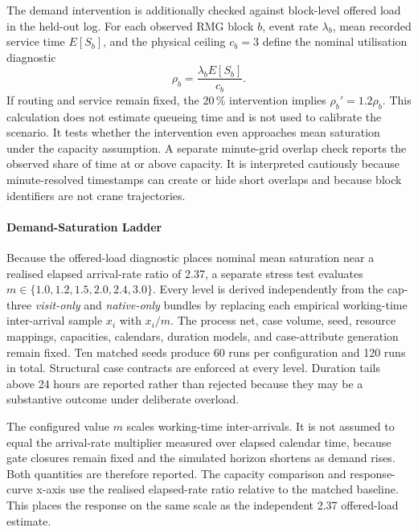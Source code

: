 The demand intervention is additionally checked against block-level offered
load in the held-out log. For each observed RMG block $b$, event rate
$\lambda_b$, mean recorded service time $E[S_b]$, and the physical ceiling
$c_b=3$ define the nominal utilisation diagnostic
\begin{equation}
    \rho_b=\frac{\lambda_b E[S_b]}{c_b}.
\end{equation}
If routing and service remain fixed, the 20\,\% intervention implies
$\rho_b'=1.2\rho_b$. This calculation does not estimate queueing time and is
not used to calibrate the scenario. It tests whether the intervention even
approaches mean saturation under the capacity assumption. A separate
minute-grid overlap check reports the observed share of time at or above
capacity. It is interpreted cautiously because minute-resolved timestamps
can create or hide short overlaps and because block identifiers are not crane
trajectories.

\paragraph{Demand-Saturation Ladder}

Because the offered-load diagnostic places nominal mean saturation near a
realised elapsed arrival-rate ratio of 2.37, a separate stress test evaluates
$m\in\{1.0,1.2,1.5,2.0,2.4,3.0\}$. Every level is derived independently from
the cap-three \textit{visit-only} and \textit{native-only} bundles by replacing
each empirical working-time inter-arrival sample $x_i$ with $x_i/m$. The
process net, case volume, seed, resource mappings, capacities, calendars,
duration models, and case-attribute generation remain fixed. Ten matched seeds
produce 60 runs per configuration and 120 runs in total. Structural case
contracts are enforced at every level. Duration tails above 24 hours are
reported rather than rejected because they may be a substantive outcome under
deliberate overload.

The configured value $m$ scales working-time inter-arrivals. It is not assumed
to equal the arrival-rate multiplier measured over elapsed calendar time,
because gate closures remain fixed and the simulated horizon shortens as
demand rises. Both quantities are therefore reported. The capacity comparison
and response-curve x-axis use the realised elapsed-rate ratio relative to the
matched baseline. This places the response on the same scale as the independent
2.37 offered-load estimate.

